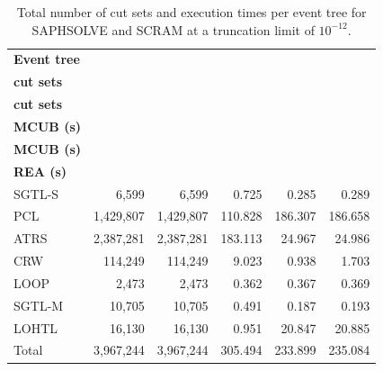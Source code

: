 \begin{table}[]
\centering
\caption{Total number of cut sets and execution times per event tree for SAPHSOLVE and SCRAM at a truncation limit of $10^{-12}$.}
\label{tab:mhtgr_cutsets_1e12}
\footnotesize
\setlength{\tabcolsep}{4pt}
\begin{tabular}{@{}lrrrrr@{}}
\toprule
\textbf{Event tree} &
\shortstack{\textbf{SAPHSOLVE}\\\textbf{cut sets}} &
\shortstack{\textbf{SCRAM}\\\textbf{cut sets}} &
\shortstack{\textbf{SAPHSOLVE}\\\textbf{MCUB (s)}} &
\shortstack{\textbf{SCRAM}\\\textbf{MCUB (s)}} &
\shortstack{\textbf{SCRAM}\\\textbf{REA (s)}} \\
\midrule
SGTL-S & 6,599     & 6,599     & 0.725   & 0.285   & 0.289   \\
PCL    & 1,429,807 & 1,429,807 & 110.828 & 186.307 & 186.658 \\
ATRS   & 2,387,281 & 2,387,281 & 183.113 & 24.967  & 24.986  \\
CRW    & 114,249   & 114,249   & 9.023   & 0.938   & 1.703   \\
LOOP   & 2,473     & 2,473     & 0.362   & 0.367   & 0.369   \\
SGTL-M & 10,705    & 10,705    & 0.491   & 0.187   & 0.193   \\
LOHTL  & 16,130    & 16,130    & 0.951   & 20.847  & 20.885  \\
\midrule
Total  & 3,967,244 & 3,967,244 & 305.494 & 233.899 & 235.084 \\
\bottomrule
\end{tabular}
\end{table}